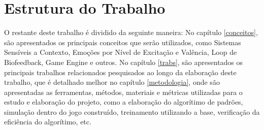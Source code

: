 \section{Estrutura do Trabalho}

O restante deste trabalho é dividido da seguinte maneira: No capítulo \ref{conceitos}, são apresentados os principais conceitos que serão utilizados, como Sistemas Sensíveis a Contexto, Emoções por Nível de Excitação e Valência, Loop de Biofeedback, Game Engine e outros. No capítulo \ref{trabs}, são apresentados os principais trabalhos relacionados pesquisados ao longo da elaboração deste trabalho, que é detalhado melhor no capítulo \ref{metodologia}, onde são apresentadas as ferramentas, métodos, materiais e métricas utilizadas para o estudo e elaboração do projeto, como a elaboração do algorítimo de padrões, simulação dentro do jogo construído, treinamento utilizando a base, verificação da eficiência do algorítimo, etc. 

